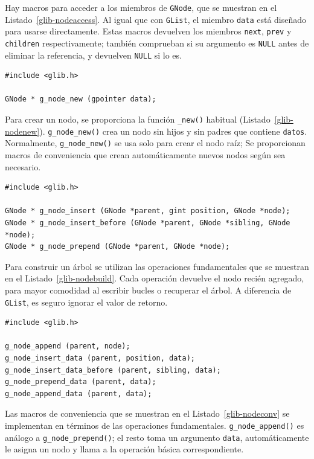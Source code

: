 Hay macros para acceder a los miembros de \lstinline{GNode}, que se muestran en el Listado~\ref{glib-nodeaccess}. Al igual que con \lstinline{GList}, el miembro \lstinline{data} está diseñado para usarse directamente. Estas macros devuelven los miembros \lstinline{next}, \lstinline{prev} y \lstinline{children} respectivamente; también comprueban si su argumento es \lstinline{NULL} antes de eliminar la referencia, y devuelven \lstinline{NULL} si lo es.

\begin{lstlisting}[float, caption={Creando un \lstinline{GNode}}, label=glib-nodenew]
#include <glib.h>

GNode * g_node_new (gpointer data);
\end{lstlisting}

Para crear un nodo, se proporciona la función \lstinline{_new()} habitual (Listado~\ref{glib-nodenew}). \lstinline{g_node_new()} crea un nodo sin hijos y sin padres que contiene \lstinline{datos}. Normalmente, \lstinline{g_node_new()} se usa solo para crear el nodo raíz; Se proporcionan macros de conveniencia que crean automáticamente nuevos nodos según sea necesario.

\begin{lstlisting}[float, caption={Construyendo un árbol \lstinline{GNode}}, label=glib-nodebuild]
#include <glib.h>

GNode * g_node_insert (GNode *parent, gint position, GNode *node);
GNode * g_node_insert_before (GNode *parent, GNode *sibling, GNode *node);
GNode * g_node_prepend (GNode *parent, GNode *node);
\end{lstlisting}

Para construir un árbol se utilizan las operaciones fundamentales que se muestran en el Listado~\ref{glib-nodebuild}. Cada operación devuelve el nodo recién agregado, para mayor comodidad al escribir bucles o recuperar el árbol. A diferencia de \lstinline{GList}, es seguro ignorar el valor de retorno.

\begin{lstlisting}[float, caption={Construyendo un \lstinline{GNode}}, label=glib-nodeconv]
#include <glib.h>

g_node_append (parent, node);
g_node_insert_data (parent, position, data);
g_node_insert_data_before (parent, sibling, data);
g_node_prepend_data (parent, data);
g_node_append_data (parent, data);
\end{lstlisting}

Las macros de conveniencia que se muestran en el Listado~\ref{glib-nodeconv} se implementan en términos de las operaciones fundamentales. \lstinline{g_node_append()} es análogo a \lstinline{g_node_prepend()}; el resto toma un argumento \lstinline{data}, automáticamente le asigna un nodo y llama a la operación básica correspondiente.

